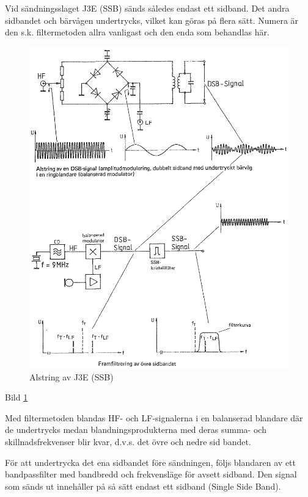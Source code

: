 Vid sändningsslaget J3E (SSB) sänds således endast ett sidband. Det
andra sidbandet och bärvågen undertrycks, vilket kan göras på flera
sätt. Numera är den s.k. filtermetoden allra vanligast och den enda
som behandlas här.

\begin{figure}
\includegraphics[width=\textwidth]{images/bild_2_3-90.png}
\caption{Alstring av J3E (SSB)}
\label{fig:BildII3-90}
\end{figure}

Bild \ref{fig:BildII3-90}


Med filtermetoden blandas HF- och LF-signalerna i en balanserad
blandare där de undertrycks medan blandningsprodukterna med deras
summa- och skillnadsfrekvenser blir kvar, d.v.s. det övre och nedre
sid bandet.

För att undertrycka det ena sidbandet före sändningen, följs blandaren
av ett bandpassfilter med bandbredd och frekvensläge för avsett
sidband. Den signal som sänds ut innehåller på så sätt endast ett
sidband (Single Side Band).

